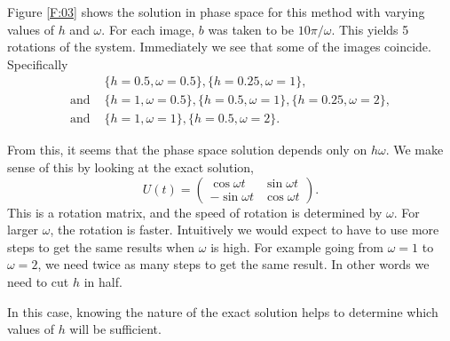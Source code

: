 \begin{solution}
  Figure \ref{F:03} shows the solution in phase space for this method with varying values of $h$ and $\omega$. For each image, $b$ was taken to be $10 \pi/\omega$. This yields 5 rotations of the system. Immediately we see that some of the images coincide. Specifically
  \begin{align*}
    &\{h = 0.5, \omega = 0.5\}, \{h = 0.25, \omega = 1\}, \\
    \text{and } &\{h = 1, \omega = 0.5\}, \{h = 0.5, \omega = 1\}, \{h = 0.25, \omega = 2\}, \\
    \text{and } &\{h = 1, \omega = 1\}, \{h = 0.5, \omega = 2\}.
  \end{align*}
  
  From this, it seems that the phase space solution depends only on $h \omega$. We make sense of this by looking at the exact solution,
  \[
    U(t) = 
    \begin{pmatrix}
      \cos \omega t & \sin \omega t \\
      -\sin \omega t & \cos \omega t
    \end{pmatrix}.
  \]
  This is a rotation matrix, and the speed of rotation is determined by $\omega$. For larger $\omega$, the rotation is faster. Intuitively we would expect to have to use more steps to get the same results when $\omega$ is high. For example going from $\omega = 1$ to $\omega = 2$, we need twice as many steps to get the same result. In other words we need to cut $h$ in half.
  
  In this case, knowing the nature of the exact solution helps to determine which values of $h$ will be sufficient. 
\end{solution}